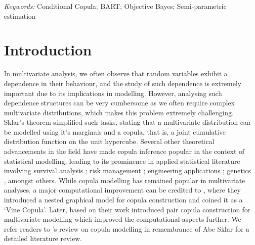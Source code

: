 \documentclass[
12pt]{article}
\begin{document}
	\noindent%
	{\it Keywords:} Conditional Copula; BART; Objective Bayes; Semi-parametric estimation
	\vfill
	
	\newpage
	
	
	\section{Introduction}
	In multivariate analysis, we often observe that random variables exhibit a dependence in their behaviour, and the study of such dependence is extremely important due to its implications in modelling. However, analysing such dependence structures can be very cumbersome as we often require complex multivariate distributions, which makes this problem extremely challenging. Sklar's theorem\citep{sklar:1959} simplified such tasks, stating that a multivariate distribution can be modelled using it's marginals and a copula, that is, a joint cumulative distribution function on the unit hypercube. Several other theoretical advancements \citep{kimeldori1975uniform,ruschendorf1976,schweizer1981,Genest01091993} in the field have made copula inference popular in the context of statistical modelling, leading to its prominence in applied statistical literature involving  survival analysis \citep 	{clayton1978model,oakes1989bivariate,zheng1995estimates}; risk management \citep{engle1990asset,fama1993common}; engineering applications \citep{salvadori2007use,aghakouchak2010copula}; genetics \citep{li2006quantitative}, amongst others. While copula modelling has remained popular in multivariate analyses, a major computational improvement can be credited to \citet{bedford_vine_2002}, where they introduced a nested graphical model for copula construction and coined it as a `Vine Copula'. Later, based on their work \citet{czado_pair_cop_2010} introduced pair copula construction for multivariate modelling which improved the computational aspects further.  We refer readers to \citet{GENEST2024105278}'s review on copula modelling in remembrance of Abe Sklar for a detailed literature review.
	
\end{document}

